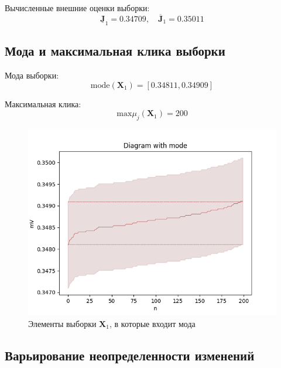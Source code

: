 \documentclass[./main.tex]{subfiles}
\begin{document}
\FloatBarrier

Вычисленные внешние оценки выборки: 
\begin{equation*}
	\underline{\bm{J}}_1 = 0.34709 , \quad \overline{\bm{J}}_1 = 0.35011
\end{equation*}
\subsection{Мода и максимальная клика выборки} 

Мода выборки: 
\begin{equation*}
	\text{mode}(\bm{X}_1) = [0.34811, 0.34909]
\end{equation*}

Максимальная клика: 
\begin{equation*}
	\text{max} \mu_j (\bm{X}_1) = 200
\end{equation*}

\begin{figure}[ht]
	\begin{center}
		\includegraphics[scale = 0.55]{../images/diagram_with_mode.png}
	\end{center} 
	\caption{Элементы выборки $\bm{X}_1$, в которые входит мода} \label{pic:mode}
\end{figure}

\FloatBarrier

\subsection{Варьирование неопределенности изменений}
\end{document}
